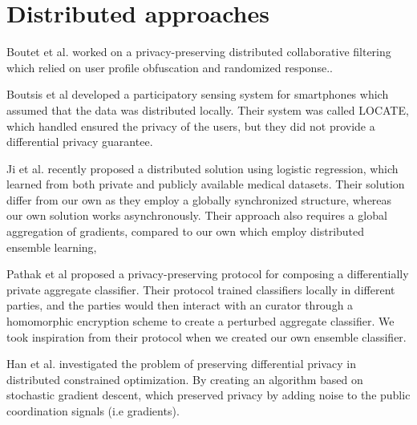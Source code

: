 \citep{yu2014logisticSNPassociation}

\citep{zhang2012functionMechanism}

\section{Distributed approaches}
Boutet et al. worked on a privacy-preserving distributed collaborative filtering which relied on user profile obfuscation and randomized response.\cite{boutet2013DisCollFil}.

Boutsis et al developed a participatory sensing system for smartphones which assumed that the data was distributed locally. Their system was called LOCATE, which handled ensured the privacy of the users, but they did not provide a differential privacy guarantee. \cite{boutsis2013}

Ji et al. \cite{ji2014DisLogReg} recently proposed a distributed solution using logistic regression, which learned from both private and publicly available medical datasets. Their solution differ from our own as they employ a globally synchronized structure, whereas our own solution works asynchronously. Their approach also requires a global aggregation of gradients, compared to our own which employ distributed ensemble learning,

Pathak et al \cite{pathak2010diffprivhomo} proposed a privacy-preserving protocol for composing a differentially private aggregate classifier. Their protocol trained classifiers locally in different parties, and the parties would then interact with an curator through a homomorphic encryption scheme to create a perturbed aggregate classifier. We took inspiration from their protocol when we created our own ensemble classifier.

Han et al. investigated the problem of preserving differential privacy in distributed constrained optimization. By creating an algorithm based on stochastic gradient descent, which preserved privacy by adding noise to the public coordination signals (i.e gradients). \cite{han2014disOptimization}






